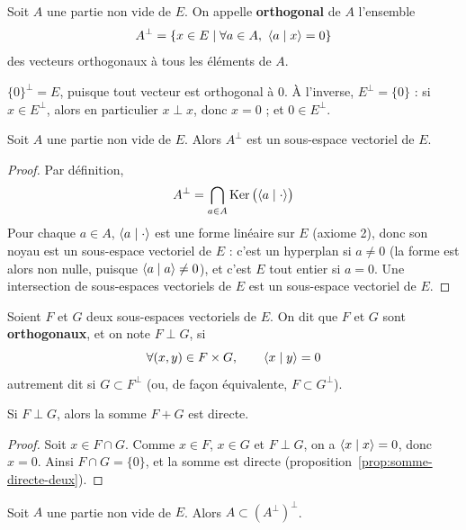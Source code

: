 \begin{defi}
\label{defi:orthogonal-partie}
Soit $A$ une partie non vide de $E$. On appelle \textbf{orthogonal} de $A$ l'ensemble
\[A^\perp=\{x\in E\mid\forall a\in A,\ \langle a\mid x\rangle=0\}\]
des vecteurs orthogonaux à tous les éléments de $A$.
\end{defi}

\begin{exemple}
$\{0\}^\perp=E$, puisque tout vecteur est orthogonal à $0$. À l'inverse, $E^\perp=\{0\}$ : si $x\in E^\perp$, alors en particulier $x\perp x$, donc $x=0$ ; et $0\in E^\perp$.
\end{exemple}

\begin{prop}
\label{prop:orthogonal-sev}
Soit $A$ une partie non vide de $E$. Alors $A^\perp$ est un sous-espace vectoriel de $E$.
\end{prop}

\begin{proof}
Par définition,
\[A^\perp=\bigcap_{a\in A}\operatorname{Ker}\big(\langle a\mid \cdot\rangle\big)\]
Pour chaque $a\in A$, $\langle a\mid \cdot\rangle$ est une forme linéaire sur $E$ (axiome 2), donc son noyau est un sous-espace vectoriel de $E$ : c'est un hyperplan si $a\neq 0$ (la forme est alors non nulle, puisque $\langle a\mid a\rangle\neq 0$), et c'est $E$ tout entier si $a=0$. Une intersection de sous-espaces vectoriels de $E$ est un sous-espace vectoriel de $E$.
\end{proof}

\begin{defi}
\label{defi:sev-orthogonaux}
Soient $F$ et $G$ deux sous-espaces vectoriels de $E$. On dit que $F$ et $G$ sont \textbf{orthogonaux}, et on note $F\perp G$, si
\[\forall (x,y)\in F\times G,\qquad\langle x\mid y\rangle=0\]
autrement dit si $G\subset F^\perp$ (ou, de façon équivalente, $F\subset G^\perp$).
\end{defi}

\begin{prop}
\label{prop:orthogonaux-somme-directe}
Si $F\perp G$, alors la somme $F+G$ est directe.
\end{prop}

\begin{proof}
Soit $x\in F\cap G$. Comme $x\in F$, $x\in G$ et $F\perp G$, on a $\langle x\mid x\rangle=0$, donc $x=0$. Ainsi $F\cap G=\{0\}$, et la somme est directe (proposition~\ref{prop:somme-directe-deux}).
\end{proof}

\begin{prop}
\label{prop:double-orthogonal}
Soit $A$ une partie non vide de $E$. Alors $A\subset(A^\perp)^\perp$.
\end{prop}


